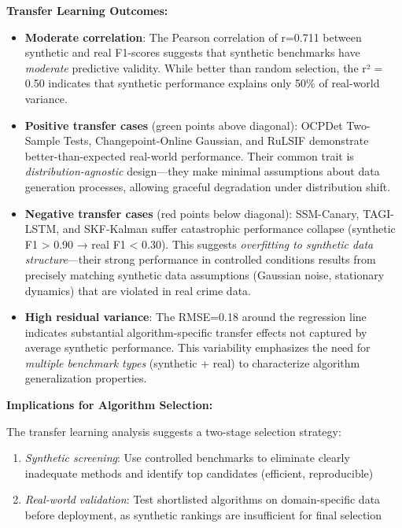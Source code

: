 \documentclass[journal,article,submit,pdftex,moreauthors]{Definitions/mdpi}
\begin{document}
\textbf{Transfer Learning Outcomes:}

\begin{itemize}
    \item \textbf{Moderate correlation}: The Pearson correlation of r=0.711 between synthetic and real F1-scores suggests that synthetic benchmarks have \textit{moderate} predictive validity. While better than random selection, the r² = 0.50 indicates that synthetic performance explains only 50\% of real-world variance.
    
    \item \textbf{Positive transfer cases} (green points above diagonal): OCPDet Two-Sample Tests, Changepoint-Online Gaussian, and RuLSIF demonstrate better-than-expected real-world performance. Their common trait is \textit{distribution-agnostic} design—they make minimal assumptions about data generation processes, allowing graceful degradation under distribution shift.
    
    \item \textbf{Negative transfer cases} (red points below diagonal): SSM-Canary, TAGI-LSTM, and SKF-Kalman suffer catastrophic performance collapse (synthetic F1 > 0.90 → real F1 < 0.30). This suggests \textit{overfitting to synthetic data structure}—their strong performance in controlled conditions results from precisely matching synthetic data assumptions (Gaussian noise, stationary dynamics) that are violated in real crime data.
    
    \item \textbf{High residual variance}: The RMSE=0.18 around the regression line indicates substantial algorithm-specific transfer effects not captured by average synthetic performance. This variability emphasizes the need for \textit{multiple benchmark types} (synthetic + real) to characterize algorithm generalization properties.
\end{itemize}

\textbf{Implications for Algorithm Selection:}

The transfer learning analysis suggests a two-stage selection strategy:
\begin{enumerate}
    \item \textit{Synthetic screening}: Use controlled benchmarks to eliminate clearly inadequate methods and identify top candidates (efficient, reproducible)
    \item \textit{Real-world validation}: Test shortlisted algorithms on domain-specific data before deployment, as synthetic rankings are insufficient for final selection
\end{enumerate}
\end{document}
